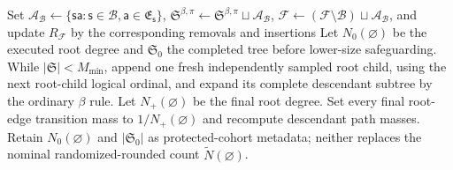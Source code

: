 \documentclass[12pt, a4paper]{article}
\begin{document}
\begin{algorithm}[H]
{{{    
  }
  }
  Set $\mathcal A_{\mathcal B}\gets
  \{\mathsf s\mathsf a:\mathsf s\in\mathcal B,\mathsf a\in\mathfrak E_{\mathsf s}\}$,
  $\mathfrak S^{\beta,\pi}\gets\mathfrak S^{\beta,\pi}\sqcup\mathcal A_{\mathcal B}$,
  $\mathcal F\gets(\mathcal F\setminus\mathcal B)\sqcup\mathcal A_{\mathcal B}$,
  and update $R_{\mathcal F}$ by the corresponding removals and insertions\;
}
Let $N_0(\varnothing)$ be the executed root degree and $\mathfrak S_0$ the
completed tree before lower-size safeguarding.  While
$|\mathfrak S|<M_{\min}$, append one fresh independently sampled root child,
using the next root-child logical ordinal, and expand its complete descendant
subtree by the ordinary $\beta$ rule.  Let $N_+(\varnothing)$ be the final root
degree.  Set every final root-edge transition mass to
$1/N_+(\varnothing)$ and recompute descendant path masses.  Retain
$N_0(\varnothing)$ and $|\mathfrak S_0|$ as protected-cohort metadata; neither
replaces the nominal randomized-rounded count $\widetilde N(\varnothing)$.
\end{algorithm}
\end{document}
